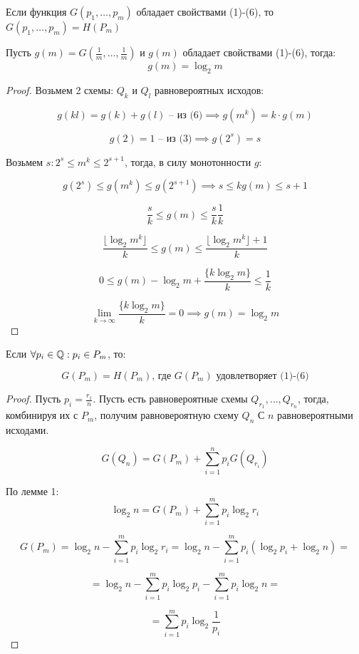 
\begin{theorem}
    \label{theorem:entropy}
    Если функция $G(p_1, \ldots, p_m)$ обладает свойствами (1)-(6), то $G(p_1, \ldots, p_m) = H(P_m)$
\end{theorem}

\begin{lemma}
    Пусть $g(m) = G(\frac{1}{m}, \ldots, \frac{1}{m})$ и $g(m)$ обладает свойствами (1)-(6), тогда:
    \[g(m) = \log_2 m\]
\end{lemma}

\begin{proof}
    Возьмем 2 схемы: $Q_k$ и $Q_l$ равновероятных исходов:

    $$g(kl) = g(k) + g(l) \text{ -- из (6)} \implies g(m^k) = k \cdot g(m)$$

    $$g(2) = 1 \text{ -- из (3)} \implies g(2^s) = s$$

    Возьмем $s: 2^s \leq m^k \leq 2^{s+1}$, тогда, в силу монотонности $g$:

    \[g(2^s) \leq g(m^k) \leq g(2^{s+1}) \implies s \leq k g(m) \leq s + 1\]

    \[\frac{s}{k} \leq g(m) \leq \frac{s}{k} \frac{1}{k}\]

    \[\frac{\lfloor \log_ 2 m^k \rfloor}{k} \leq g(m) \leq \frac{\lfloor \log_ 2 m^k \rfloor + 1}{k}\]

    \[0 \leq g(m) - \log_2 m + \frac{\{k \log_2 m\}}{k} \leq \frac{1}{k}\]

    \[\lim_{k \to \infty} \frac{\{k \log_2 m\}}{k} = 0 \implies g(m) = \log_2 m\]
\end{proof}


\begin{lemma}
    Если $\forall p_i \in \mathbb{Q}: p_i \in P_m$, то:

    \[G(P_m) = H(P_m) \text{, где } G(P_m) \text{ удовлетворяет (1)-(6)}\]
\end{lemma}
\begin{proof}
    Пусть $p_i = \frac{r_1}{n}$. Пусть есть равновероятные схемы $Q_{r_1}, \ldots, Q_{r_n}$, тогда, 
    комбинируя их с $P_m$, получим равновероятную схему $Q_{n}$ С $n$ равновероятными исходами.
    
    \[G(Q_n) = G(P_m) + \sum_{i=1}^{n} p_i G(Q_{r_i})\]

    По лемме 1:
    \[\log_2 n = G(P_m) + \sum_{i=1}^{m} p_i \log_2 r_i\]

    \[G(P_m) = \log_2 n - \sum_{i=1}^{m} p_i \log_2 r_i = \log_2 n - \sum_{i=1}^{m} p_i( \log_2 p_i + \log_2 n) =\]
    
    \[= \log_2 n - \sum_{i=1}^{m} p_i \log_2 p_i - \sum_{i=1}^{m} p_i \log_2 n = \]
    
    \[= \sum_{i=1}^{m} p_i \log_2 \frac{1}{p_i}\]
\end{proof}


